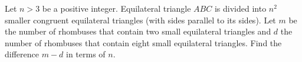 Let $n > 3$ be a positive integer.
Equilateral triangle $ABC$ is divided into $n^2$ smaller congruent equilateral triangles (with sides parallel to its sides).
Let $m$ be the number of rhombuses that contain two small equilateral triangles and $d$ the number of rhombuses that contain eight small equilateral triangles.
Find the difference $m-d$ in terms of $n$.
